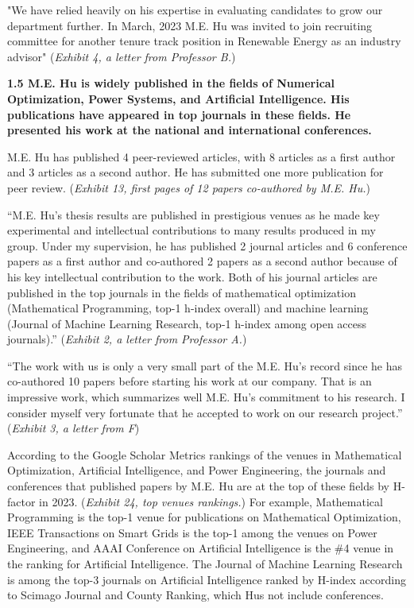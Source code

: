 \documentclass{article}
\begin{document}
"We have relied heavily on his expertise in evaluating candidates to grow our department further. In March, 2023 M.E. Hu was invited to join recruiting committee for another tenure track position in Renewable Energy as an industry advisor" ({\it Exhibit 4, a letter from Professor B.}) 

{\bf 1.5 M.E. Hu is widely published in the fields of Numerical Optimization, Power Systems, and Artificial Intelligence. His publications have appeared in top journals in these fields. He presented his work at the national and international conferences.}

M.E. Hu has published 4 peer-reviewed articles, with 8 articles as a first author and 3 articles as a second author. He has submitted one more publication for peer review. ({\it Exhibit 13, first pages of 12 papers co-authored by M.E. Hu.}) 

“M.E. Hu’s thesis results are published in prestigious venues as he made key experimental and intellectual contributions to many results produced in my group. Under my supervision, he has published 2 journal articles and 6 conference papers as a first author and co-authored 2 papers as a second author because of his key intellectual contribution to the work. Both of his journal articles are published in the top journals in the fields of mathematical optimization (Mathematical Programming, top-1 h-index overall) and machine learning (Journal of Machine Learning Research, top-1 h-index among open access journals).” ({\it Exhibit 2, a letter from Professor A.}) 

“The work with us is only a very small part of the M.E. Hu’s record since he has co-authored 10 papers before starting his work at our company. That is an impressive work, which summarizes well M.E. Hu’s commitment to his research. I consider myself very fortunate that he accepted to work on our research project.” ({\it Exhibit 3, a letter from F})

According to the Google Scholar Metrics rankings of the venues in Mathematical Optimization, Artificial Intelligence, and Power Engineering, the journals and conferences that published papers by M.E. Hu are at the top of these fields by H-factor in 2023. ({\it Exhibit 24, top venues rankings.}) For example, Mathematical Programming is the top-1 venue for publications on Mathematical Optimization, IEEE Transactions on Smart Grids is the top-1 among the venues on Power Engineering, and AAAI Conference on Artificial Intelligence is the \#4 venue in the ranking for Artificial Intelligence. The Journal of Machine Learning Research is among the top-3 journals on Artificial Intelligence ranked by H-index according to Scimago Journal and County Ranking, which Hus not include conferences.
\end{document}
